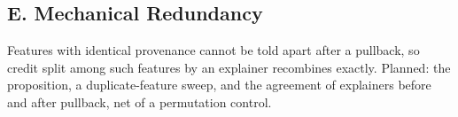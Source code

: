 \subsection*{E. Mechanical Redundancy}
\label{sec:XML:AppRedundancy}

\begin{proposalbox}
Features with identical provenance cannot be told apart after a pullback, so credit split among such features by an explainer recombines exactly. Planned: the proposition, a duplicate-feature sweep, and the agreement of explainers before and after pullback, net of a permutation control.
\end{proposalbox}


